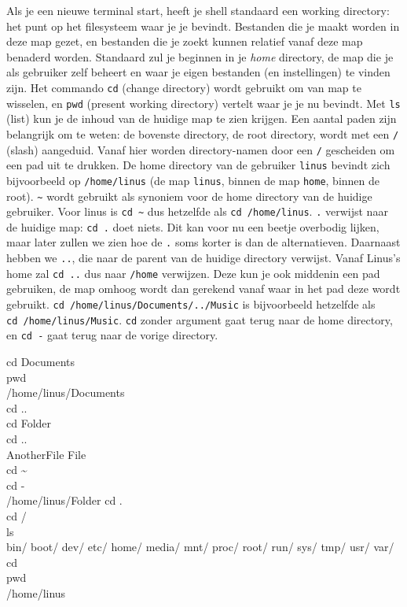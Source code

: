 Als je een nieuwe terminal start, heeft je shell standaard een working directory: het punt op het filesysteem waar je je bevindt. Bestanden die je maakt worden in deze map gezet, en bestanden die je zoekt kunnen relatief vanaf deze map benaderd worden. Standaard zul je beginnen in je \emph{home} directory, de map die je als gebruiker zelf beheert en waar je eigen bestanden (en instellingen) te vinden zijn. Het commando \texttt{cd} (change directory) wordt gebruikt om van map te wisselen, en \texttt{pwd} (present working directory) vertelt waar je je nu bevindt. Met \texttt{ls} (list) kun je de inhoud van de huidige map te zien krijgen. Een aantal paden zijn belangrijk om te weten: de bovenste directory, de root directory, wordt met een \texttt{/} (slash) aangeduid. Vanaf hier worden directory-namen door een \texttt{/} gescheiden om een pad uit te drukken. De home directory van de gebruiker \texttt{linus} bevindt zich bijvoorbeeld op \texttt{/home/linus} (de map \texttt{linus}, binnen de map \texttt{home}, binnen de root). \texttt{\textasciitilde} wordt gebruikt als synoniem voor de home directory van de huidige gebruiker. Voor linus is \texttt{cd\ \textasciitilde} dus hetzelfde als \texttt{cd\ /home/linus}. \texttt{.} verwijst naar de huidige map: \texttt{cd\ .} doet niets. Dit kan voor nu een beetje overbodig lijken, maar later zullen we zien hoe de \texttt{.} soms korter is dan de alternatieven. Daarnaast hebben we \texttt{..}, die naar de parent van de huidige directory verwijst. Vanaf Linus's home zal \texttt{cd\ ..} dus naar \texttt{/home} verwijzen. Deze kun je ook middenin een pad gebruiken, de map omhoog wordt dan gerekend vanaf waar in het pad deze wordt gebruikt. \texttt{cd\ /home/linus/Documents/../Music} is bijvoorbeeld hetzelfde als \texttt{cd\ /home/linus/Music}. \texttt{cd} zonder argument gaat terug naar de home directory, en \texttt{cd\ -} gaat terug naar de vorige directory.

\begin{bash}
\userprompt cd Documents\\
 pwd\\
/home/linus/Documents\\
 cd ..\\
\userprompt cd Folder\\
 cd ..\\
AnotherFile  File\\
 cd \textasciitilde\\
\userprompt cd -\\
/home/linus/Folder
 cd .\\
 cd /\\
\userprompt[/] ls\\
bin/  boot/  dev/  etc/  home/  media/  mnt/  proc/  root/  run/  sys/  tmp/  usr/  var/\\
\userprompt[/] cd\\
\userprompt pwd\\
/home/linus\\
\end{bash}

